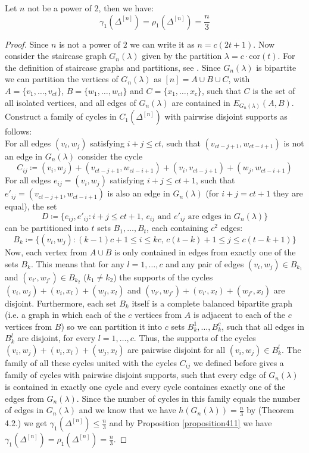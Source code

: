 \begin{thm}\label{theorem421}
Let \(n\) not be a power of \(2\), then we have:
\[
\gamma_1(\Delta^{[n]})=\rho_1(\Delta^{[n]})=\frac{n}{3}
\] 
\begin{proof}
Since \(n\) is not a power of \(2\) we can write it as \(n=c(2t+1)\). Now consider the staircase graph \(G_n(\lambda)\) given by the partition \(\lambda=c\cdot\text{cor}(t)\). For the definition of staircase graphs and partitions, see \cite{1}. Since \(G_n(\lambda)\) is bipartite we can partition the vertices of \(G_n(\lambda)\) as \([n]=A\cup B\cup C\), with \(A=\{v_1,\ldots,v_{ct}\}\), \(B=\{w_1,\ldots,w_{ct}\}\) and \(C=\{x_1,\ldots,x_c\}\), such that \(C\) is the set of all isolated vertices, and all edges of \(G_n(\lambda)\) are contained in \(E_{G_n(\lambda)}(A,B)\). Construct a family of cycles in \(C_1(\Delta^{[n]})\) with pairwise disjoint supports as follows:\\
For all edges \((v_i,w_j)\) satisfying \(i+j\leq ct\), such that \((v_{ct-j+1},w_{ct-i+1})\) is not an edge in \(G_n(\lambda)\) consider the cycle
\[
C_{ij}\coloneqq (v_i,w_j)+(v_{ct-j+1},w_{ct-i+1})+(v_i,v_{ct-j+1})+(w_j,w_{ct-i+1})
\]
For all edges \(e_{ij}=(v_i,w_j)\) satisfying \(i+j\leq ct+1\), such that \(e'_{ij}=(v_{ct-j+1},w_{ct-i+1})\) is also an edge in \(G_n(\lambda)\) (for \(i+j=ct+1\) they are equal), the set
\[
D\coloneqq\{e_{ij}, e'_{ij}:i+j\leq ct+1\text{, }e_{ij}\text{ and }e'_{ij}\text{ are edges in }G_n(\lambda)\}
\] can be partitioned into \(t\) sets \(B_1,\ldots,B_t\), each containing \(c^2\) edges:
\[
B_k\coloneqq\{(v_i,w_j):(k-1)c+1\leq i\leq kc\text{, }c(t-k)+1\leq j\leq c(t-k+1)\}
\]
Now, each vertex from \(A\cup B\) is only contained in edges from exactly one of the sets \(B_k\). This means that for any \(l=1,\ldots,c\) and any pair of edges \((v_i,w_j)\in B_{k_1}\) and \((v_{i'},w_{j'})\in B_{k_2}\) (\(k_1\neq k_2\)) the supports of the cycles \((v_i,w_j)+(v_i,x_l)+(w_j,x_l)\) and \((v_{i'},w_{j'})+(v_{i'},x_l)+(w_{j'},x_l)\) are disjoint. Furthermore, each set \(B_k\) itself is a complete balanced bipartite graph (i.e. a graph in which each of the \(c\) vertices from \(A\) is adjacent to each of the \(c\) vertices from \(B\)) so we can partition it into \(c\) sets \(B_k^1,\ldots,B_k^c\), such that all edges in \(B_k^l\) are disjoint, for every \(l=1,\ldots,c\). Thus, the supports of the cycles \((v_i,w_j)+(v_i,x_l)+(w_j,x_l)\) are pairwise disjoint for all \((v_i,w_j)\in B_k^l\). The family of all these cycles united with the cycles \(C_{ij}\) we defined before gives a family of cycles with pairwise disjoint supports, such that every edge of \(G_n(\lambda)\) is contained in exactly one cycle and every cycle containes exactly one of the edges from \(G_n(\lambda)\). Since the number of cycles in this family equals the number of edges in \(G_n(\lambda)\) and we know that we have \(h(G_n(\lambda))=\frac{n}{3}\) by \cite{1} (Theorem 4.2.) we get \(\gamma_1(\Delta^{[n]})\leq\frac{n}{3}\) and by Proposition \ref{proposition411} we have \(\gamma_1(\Delta^{[n]})=\rho_1(\Delta^{[n]})=\frac{n}{3}\).
\end{proof}
\end{thm}

